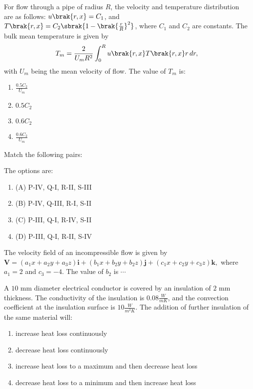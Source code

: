

 \item For flow through a pipe of radius $R$, the velocity and temperature distribution are as follows:
    $u\brak{r, x} = C_1$, and $T\brak{r, x} = C_2 \sbrak{1 - \brak{\frac{r}{R}}^2}$, where $C_1$ and $C_2$ are constants. The bulk mean temperature is given by
    $$T_m = \frac{2}{U_m R^2} \int_0^R u\brak{r,x} T\brak{r, x} r \, dr,$$ 
    with $U_m$ being the mean velocity of flow. The value of $T_m$ is:
    \begin{enumerate}
        \item $\frac{0.5C_2}{U_m}$
        \item $0.5C_2$
        \item $0.6C_2$
        \item $\frac{0.6C_2}{U_m}$
    \end{enumerate}
\item Match the following pairs:
	
    
    The options are:
    \begin{enumerate}
        \item (A) P-IV, Q-I, R-II, S-III
        \item (B) P-IV, Q-III, R-I, S-II
        \item (C) P-III, Q-I, R-IV, S-II
        \item (D) P-III, Q-I, R-II, S-IV
    \end{enumerate}
    
 \item The velocity field of an incompressible flow is given by
    $
    \mathbf{V} = (a_1 x + a_2 y + a_3 z) \mathbf{i} + (b_1 x + b_2 y + b_2 z) \mathbf{j} + (c_1 x + c_2 y + c_3 z) \mathbf{k},
    $
    where $a_1 = 2$ and $c_3 = -4$. The value of $b_2$ is $\cdots$

 \item A $10$ mm diameter electrical conductor is covered by an insulation of $2$ mm thickness. The conductivity of the insulation is $0.08 \frac{W}{mK}$, and the convection coefficient at the insulation surface is $10 \frac{W}{m^2K}$. The addition of further insulation of the same material will:
    \begin{enumerate}
        \item  increase heat loss continuously
        \item  decrease heat loss continuously
        \item  increase heat loss to a maximum and then decrease heat loss
        \item  decrease heat loss to a minimum and then increase heat loss
    \end{enumerate}

